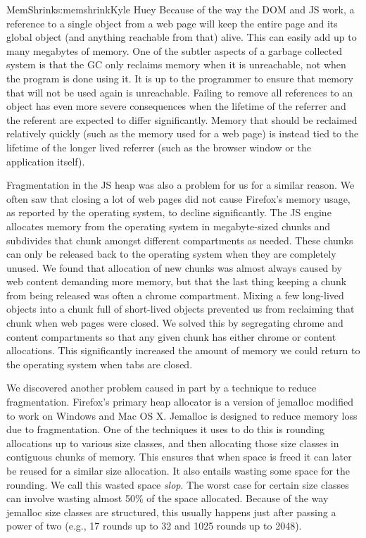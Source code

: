 \begin{aosachapter}{MemShrink}{s:memshrink}{Kyle Huey}
Because of the way the DOM and JS work, a reference to a single object
from a web page will keep the entire page and its global object (and
anything reachable from that) alive. This can easily add up to many
megabytes of memory. One of the subtler aspects of a garbage collected
system is that the GC only reclaims memory when it is unreachable, not
when the program is done using it. It is up to the programmer to ensure
that memory that will not be used again is unreachable. Failing to
remove all references to an object has even more severe consequences
when the lifetime of the referrer and the referent are expected to
differ significantly. Memory that should be reclaimed relatively quickly
(such as the memory used for a web page) is instead tied to the lifetime
of the longer lived referrer (such as the browser window or the
application itself).

Fragmentation in the JS heap was also a problem for us for a similar
reason. We often saw that closing a lot of web pages did not cause
Firefox's memory usage, as reported by the operating system, to decline
significantly. The JS engine allocates memory from the operating system
in megabyte-sized chunks and subdivides that chunk amongst different
compartments as needed. These chunks can only be released back to the
operating system when they are completely unused. We found that
allocation of new chunks was almost always caused by web content
demanding more memory, but that the last thing keeping a chunk from
being released was often a chrome compartment. Mixing a few long-lived
objects into a chunk full of short-lived objects prevented us from
reclaiming that chunk when web pages were closed. We solved this by
segregating chrome and content compartments so that any given chunk has
either chrome or content allocations. This significantly increased the
amount of memory we could return to the operating system when tabs are
closed.

We discovered another problem caused in part by a technique to reduce
fragmentation. Firefox's primary heap allocator is a version of jemalloc
modified to work on Windows and Mac OS X. Jemalloc is designed to reduce
memory loss due to fragmentation. One of the techniques it uses to do
this is rounding allocations up to various size classes, and then
allocating those size classes in contiguous chunks of memory. This
ensures that when space is freed it can later be reused for a similar
size allocation. It also entails wasting some space for the rounding. We
call this wasted space \emph{slop}. The worst case for certain size
classes can involve wasting almost 50\% of the space allocated. Because
of the way jemalloc size classes are structured, this usually happens
just after passing a power of two (e.g., 17 rounds up to 32 and 1025
rounds up to 2048).


\end{aosachapter}
